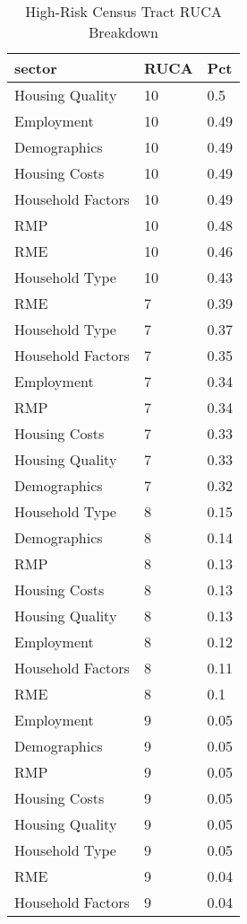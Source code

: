 \begin{table}[ht]
    \caption{High-Risk Census Tract RUCA Breakdown}
    \label{tab:ruca_risk}
    \small
    \centering
    \begin{tabular}{|l|l|l|}
        \hline
       sector & RUCA & Pct \\ 
        \hline
      Housing Quality & 10 & 0.5 \\ 
      \hline
        Employment & 10 & 0.49 \\ 
        \hline
        Demographics & 10 & 0.49 \\ 
        \hline
        Housing Costs & 10 & 0.49 \\ 
        \hline
        Household Factors & 10 & 0.49 \\ 
        \hline
        RMP & 10 & 0.48 \\
        \hline
        RME & 10 & 0.46 \\ 
        \hline
        Household Type & 10 & 0.43 \\ 
        \hline
        RME & 7 & 0.39 \\ 
        \hline
        Household Type & 7 & 0.37 \\ 
        \hline
        Household Factors & 7 & 0.35 \\ 
        \hline
        Employment & 7 & 0.34 \\ 
        \hline
        RMP & 7 & 0.34 \\
        \hline 
        Housing Costs & 7 & 0.33 \\ 
        \hline
        Housing Quality & 7 & 0.33 \\ 
        \hline
        Demographics & 7 & 0.32 \\ 
        \hline
        Household Type & 8 & 0.15 \\ 
        \hline
        Demographics & 8 & 0.14 \\ 
        \hline
        RMP & 8 & 0.13 \\ 
        \hline
        Housing Costs & 8 & 0.13 \\ 
        \hline
        Housing Quality & 8 & 0.13 \\ 
        \hline
        Employment & 8 & 0.12 \\ 
        \hline
        Household Factors & 8 & 0.11 \\ 
        \hline
        RME & 8 & 0.1 \\ 
        \hline
        Employment & 9 & 0.05 \\ 
        \hline
        Demographics & 9 & 0.05 \\ 
        \hline
        RMP & 9 & 0.05 \\ 
        \hline
        Housing Costs & 9 & 0.05 \\ 
        \hline
        Housing Quality & 9 & 0.05 \\ 
        \hline
        Household Type & 9 & 0.05 \\ 
        \hline
        RME & 9 & 0.04 \\ 
        \hline
        Household Factors & 9 & 0.04 \\ 
         \hline
      \end{tabular}
      \end{table}